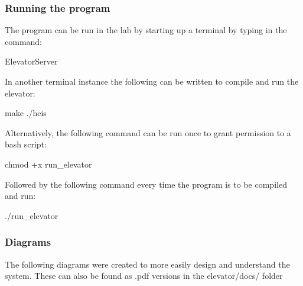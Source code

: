 \subsubsection*{Running the program}

The program can be run in the lab by starting up a terminal by typing in the command\+:


\begin{DoxyCode}
ElevatorServer
\end{DoxyCode}


In another terminal instance the following can be written to compile and run the elevator\+:


\begin{DoxyCode}
make
./heis
\end{DoxyCode}


Alternatively, the following command can be run once to grant permission to a bash script\+:


\begin{DoxyCode}
chmod +x run\_elevator
\end{DoxyCode}


Followed by the following command every time the program is to be compiled and run\+:


\begin{DoxyCode}
./run\_elevator
\end{DoxyCode}
 



\subsubsection*{Diagrams}

The following diagrams were created to more easily design and understand the system. These can also be found as {\ttfamily .pdf} versions in the {\ttfamily elevator/docs/} folder





 